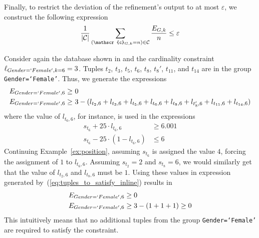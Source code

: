 Finally, to restrict the deviation of the refinement's output to at most $\varepsilon$, we construct the following expression
\begin{align}
\frac{1}{|\constraints|}\sum_{(\mathscr{c}_{G, k} = n) \in \constraints} \frac{E_{G, k}}{n} \leq \varepsilon \label{eq:max_deviation_inline}
\end{align}


\begin{example}
\label{ex:deviation}
Consider again the database shown in  and the cardinality constraint $\ell_{Gender=`Female', k=6} = 3$. %
Tuples $t_2$, $t_3$, $t_5$, $t_6$, $t_8$, $t_8'$, $t_{11}$, and $t_{14}$ are in the group {\tt Gender=`Female'}. Thus, we generate the expressions
\begin{align*}
\begin{split}
E_{Gender=`Female', 6} \geq&~ 0 \\
E_{Gender=`Female', 6} \geq& ~3 - (l_{t_2, 6}+l_{t_3, 6}+l_{t_5, 6}+l_{t_6, 6}+l_{t_8, 6}+l_{t_8', 6}+l_{t_{11}, 6}+l_{t_{14}, 6})
\end{split}
\end{align*}
where the value of $l_{t_6, 6}$, for instance, is used in the expressions
\begin{align*}
    s_{t_6} + 25 \cdot l_{t_6, 6} &\geq 6.001 \\
    s_{t_6} - 25 \cdot (1 - l_{t_6, 6}) &\leq 6
\end{align*}
Continuing Example~\ref{ex:position}, assuming $s_{t_6}$ is assigned the value $4$, forcing the assignment of $1$ to $l_{t_6, 6}$. Assuming $s_{t_2} = 2$ and $s_{t_8} = 6$, we would similarly get that the value of $l_{t_2, 6}$ and $l_{t_8, 6}$ must be $1$. Using these values in expression generated by~(\ref{eq:tuples_to_satisfy_inline}) results in 
\begin{align*}
E_{Gender=`Female', 6} &\geq 0 \\
E_{Gender=`Female', 6} &\geq 3 - (1+1+1) \geq 0
\end{align*}
This intuitively means that no additional tuples from the group {\tt {Gender=`Female'}} are required to satisfy the constraint. 



\end{example}


